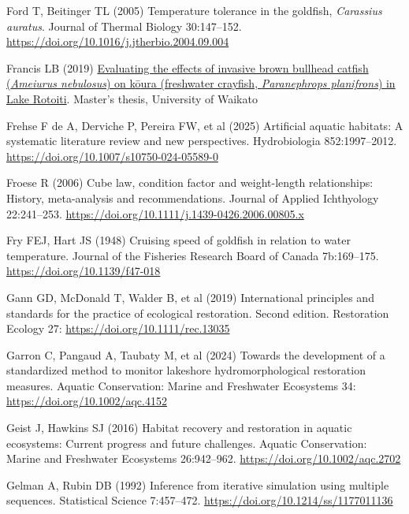 \documentclass[
  12pt,
  a4paper,
]{scrbook}
\newlength{\cslhangindent}
\newenvironment{CSLReferences}[2] %
 {\begin{list}{}{%
  \setlength{\itemindent}{0pt}
  \setlength{\leftmargin}{0pt}
  \setlength{\parsep}{0pt}
  \ifodd #1
   \setlength{\leftmargin}{\cslhangindent}
   \setlength{\itemindent}{-1\cslhangindent}
  \fi
  \setlength{\itemsep}{#2\baselineskip}}}
 {\end{list}}
\begin{document}
\begin{CSLReferences}{1}{1}
Ford T, Beitinger TL (2005) Temperature tolerance in the goldfish,
{\emph{Carassius auratus}}. Journal of Thermal Biology 30:147--152.
\url{https://doi.org/10.1016/j.jtherbio.2004.09.004}

Francis LB (2019)
\href{https://researchcommons.waikato.ac.nz/handle/10289/12746}{Evaluating
the effects of invasive brown bullhead catfish ({\emph{Ameiurus
nebulosus}}) on k{ō}ura (freshwater crayfish, {\emph{Paranephrops
planifrons}}) in {Lake Rotoiti}}. Master's thesis, University of Waikato

Frehse F de A, Derviche P, Pereira FW, et al (2025) Artificial aquatic
habitats: A systematic literature review and new perspectives.
Hydrobiologia 852:1997--2012.
\url{https://doi.org/10.1007/s10750-024-05589-0}

Froese R (2006) Cube law, condition factor and weight-length
relationships: History, meta-analysis and recommendations. Journal of
Applied Ichthyology 22:241--253.
\url{https://doi.org/10.1111/j.1439-0426.2006.00805.x}

Fry FEJ, Hart JS (1948) Cruising speed of goldfish in relation to water
temperature. Journal of the Fisheries Research Board of Canada
7b:169--175. \url{https://doi.org/10.1139/f47-018}

Gann GD, McDonald T, Walder B, et al (2019) International principles and
standards for the practice of ecological restoration. {Second edition}.
Restoration Ecology 27: \url{https://doi.org/10.1111/rec.13035}

Garron C, Pangaud A, Taubaty M, et al (2024) Towards the development of
a standardized method to monitor lakeshore hydromorphological
restoration measures. Aquatic Conservation: Marine and Freshwater
Ecosystems 34: \url{https://doi.org/10.1002/aqc.4152}

Geist J, Hawkins SJ (2016) Habitat recovery and restoration in aquatic
ecosystems: Current progress and future challenges. Aquatic
Conservation: Marine and Freshwater Ecosystems 26:942--962.
\url{https://doi.org/10.1002/aqc.2702}

Gelman A, Rubin DB (1992) Inference from iterative simulation using
multiple sequences. Statistical Science 7:457--472.
\url{https://doi.org/10.1214/ss/1177011136}


\end{CSLReferences}
\end{document}
